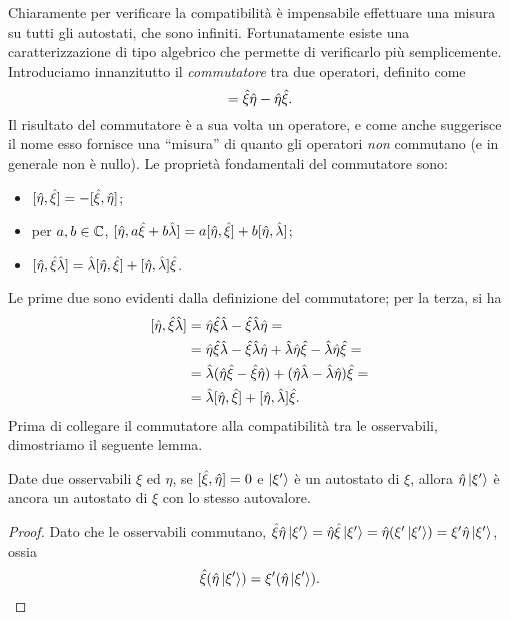 Chiaramente per verificare la compatibilità è impensabile effettuare una misura su tutti gli autostati, che sono infiniti.
Fortunatamente esiste una caratterizzazione di tipo algebrico che permette di verificarlo più semplicemente.
Introduciamo innanzitutto il \emph{commutatore} tra due operatori, definito come
\begin{equation}
	[\op\xi,\op\eta]=\op\xi\op\eta-\op\eta\op\xi.
	\label{eq:commutatore}
\end{equation}
Il risultato del commutatore è a sua volta un operatore, e come anche suggerisce il nome esso fornisce una ``misura'' di quanto gli operatori \emph{non} commutano (e in generale non è nullo).
Le proprietà fondamentali del commutatore sono:
\begin{itemize}
	\item $[\hat{\eta},\hat{\xi}]=-[\hat{\xi},\hat{\eta}]$;
	\item per $a,b\in\mathbb{C}$, $[\hat{\eta},a\hat{\xi}+b\hat{\lambda}]=a[\hat{\eta},\hat{\xi}]+b[\hat{\eta},\hat{\lambda}]$;
	\item $[\hat{\eta},\hat{\xi}\hat{\lambda}]=\hat{\lambda}[\hat{\eta},\hat{\xi}]+[\hat{\eta},\hat{\lambda}]\hat{\xi}$.
\end{itemize}
Le prime due sono evidenti dalla definizione del commutatore; per la terza, si ha
\begin{equation}
	\begin{split}
		[\hat{\eta},\hat{\xi}\hat{\lambda}]&=\hat{\eta}\hat{\xi}\hat{\lambda}-\hat{\xi}\hat{\lambda}\hat{\eta}=\\
		&=\hat{\eta}\hat{\xi}\hat{\lambda}-\hat{\xi}\hat{\lambda}\hat{\eta}+\hat{\lambda}\hat{\eta}\hat{\xi}-\hat{\lambda}\hat{\eta}\hat{\xi}=\\
		&=\hat{\lambda}(\hat{\eta}\hat{\xi}-\hat{\xi}\hat{\eta})+(\hat{\eta}\hat{\lambda}-\hat{\lambda}\hat{\eta})\hat{\xi}=\\
		&=\hat{\lambda}[\hat{\eta},\hat{\xi}]+[\hat{\eta},\hat{\lambda}]\hat{\xi}.
	\end{split}
\end{equation}
Prima di collegare il commutatore alla compatibilità tra le osservabili, dimostriamo il seguente lemma.
\begin{lemma} \label{l:autostati-compatibili}
	Date due osservabili $\xi$ ed $\eta$, se $[\hat{\xi},\hat{\eta}]=0$ e $\left|{\xi'}\right\rangle$ è un autostato di $\xi$, allora $\hat{\eta}\left|{\xi'}\right\rangle$ è ancora un autostato di $\xi$ con lo stesso autovalore.
\end{lemma}
\begin{proof}
	Dato che le osservabili commutano, $\hat{\xi}\hat{\eta}\left|{\xi'}\right\rangle=\hat{\eta}\hat{\xi}\left|{\xi'}\right\rangle=\hat{\eta}(\xi'\left|{\xi'}\right\rangle)=\xi'\hat{\eta}\left|{\xi'}\right\rangle$, ossia
	\begin{equation}
		\hat{\xi}(\hat{\eta}\left|{\xi'}\right\rangle)=\xi'(\hat{\eta}\left|{\xi'}\right\rangle).\qedhere
	\end{equation}
\end{proof}
